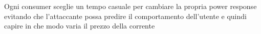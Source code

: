Ogni consumer sceglie un tempo casuale per cambiare la propria power response evitando che l’attaccante possa predire il comportamento dell’utente e quindi capire in che modo varia il prezzo della corrente
